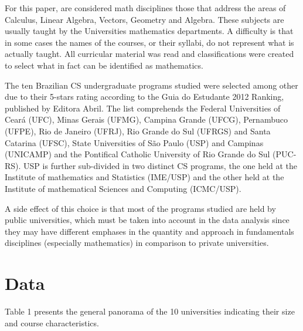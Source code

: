 \documentclass[conference]{IEEEtran}
\begin{document}
	


	For this paper, are considered math disciplines those that address the areas of Calculus, Linear Algebra, Vectors, Geometry and Algebra. These subjects are usually taught by the Universities mathematics departments. A difficulty is that in some cases the names of the courses, or their syllabi, do not represent what is actually taught. All curricular material was read and classifications were created to select what in fact can be identified as mathematics.

	The ten Brazilian CS undergraduate programs studied were selected among other due to their 5-stars rating according to the Guia do Estudante 2012 Ranking, published by Editora Abril. \cite{guia_estudante} The list comprehends the Federal Universities of Ceará (UFC), Minas Gerais (UFMG), Campina Grande (UFCG), Pernambuco (UFPE), Rio de Janeiro (UFRJ), Rio Grande do Sul (UFRGS) and Santa Catarina (UFSC), State Universities of São Paulo (USP) and Campinas (UNICAMP) and the Pontifical Catholic University of Rio Grande do Sul (PUC-RS). USP is further sub-divided in two distinct CS programs, the one held at the Institute of mathematics and Statistics (IME/USP) and the other held at the Institute of mathematical Sciences and Computing (ICMC/USP).
	
	A side effect of this choice is that most of the programs studied are held by public universities, which must be taken into account in the data analysis since they may have different emphases in the quantity and approach in fundamentals disciplines (especially mathematics) in comparison to private universities.
	
\section{Data}
Table 1 presents the general panorama of the 10 universities indicating their size and course characteristics.
\end{document}
